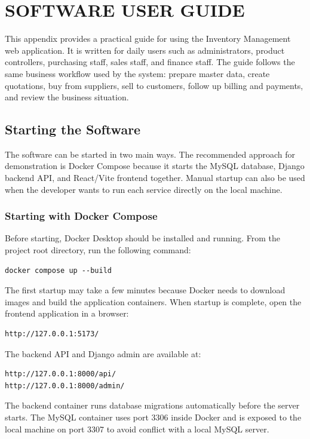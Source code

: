 \chapter{SOFTWARE USER GUIDE}

This appendix provides a practical guide for using the Inventory Management web application. It is written for daily users such as administrators, product controllers, purchasing staff, sales staff, and finance staff. The guide follows the same business workflow used by the system: prepare master data, create quotations, buy from suppliers, sell to customers, follow up billing and payments, and review the business situation.

\section{Starting the Software}

The software can be started in two main ways. The recommended approach for demonstration is Docker Compose because it starts the MySQL database, Django backend API, and React/Vite frontend together. Manual startup can also be used when the developer wants to run each service directly on the local machine.

\subsection{Starting with Docker Compose}

Before starting, Docker Desktop should be installed and running. From the project root directory, run the following command:

\begin{verbatim}
docker compose up --build
\end{verbatim}

The first startup may take a few minutes because Docker needs to download images and build the application containers. When startup is complete, open the frontend application in a browser:

\begin{verbatim}
http://127.0.0.1:5173/
\end{verbatim}

The backend API and Django admin are available at:

\begin{verbatim}
http://127.0.0.1:8000/api/
http://127.0.0.1:8000/admin/
\end{verbatim}

The backend container runs database migrations automatically before the server starts. The MySQL container uses port 3306 inside Docker and is exposed to the local machine on port 3307 to avoid conflict with a local MySQL server.

